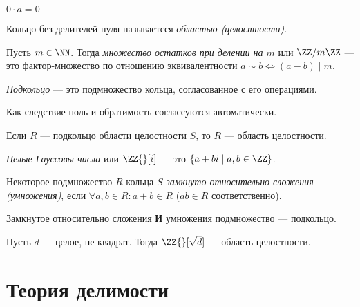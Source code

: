 \documentclass[12pt,a4paper]{article}
\begin{document}
    \begin{lemma*}
        $0 \cdot a = 0$
    \end{lemma*}

    \begin{definition}
        Кольцо без делителей нуля называетсся \emph{областью (целостности)}.
    \end{definition}

    \begin{definition}
        Пусть $m\in\NN$. Тогда \emph{множество остатков при делении на $m$} или $\ZZ/m\ZZ$ --- это фактор-множество по отношению эквивалентности $a\sim b \Leftrightarrow (a-b) \mid m$.
    \end{definition}

    \begin{definition}
        \emph{Подкольцо} --- это подмножество кольца, согласованное с его операциями.

        Как следствие ноль и обратимость соглассуются автоматически.
    \end{definition}

    \begin{statement}
        Если $R$ --- подкольцо области целостности $S$, то $R$ --- область целостности.
    \end{statement}

    \begin{definition}
        \emph{Целые Гауссовы числа} или $\ZZ{}[i]$ --- это $\{a + bi \mid a, b \in \ZZ\}$.
    \end{definition}

    \begin{definition}
        Некоторое подмножество $R$ кольца $S$ \emph{замкнуто относительно сложения (умножения)}, если $\forall a, b \in R: a + b \in R$ ($ab \in R$ соответственно).
    \end{definition}

    \begin{remark}
        Замкнутое относительно сложения \textbf{И} умножения подмножество --- подкольцо.
    \end{remark}

    \begin{example}
        Пусть $d$ --- целое, не квадрат. Тогда $\ZZ{}[\sqrt{d}]$ --- область целостности.
    \end{example}

    \section{Теория делимости}
\end{document}
